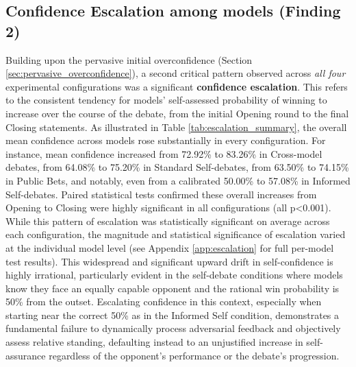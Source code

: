 \documentclass{article}
\begin{document}
\subsection{Confidence Escalation among models (Finding 2)}
Building upon the pervasive initial overconfidence (Section \ref{sec:pervasive_overconfidence}), a second critical pattern observed across \emph{all four} experimental configurations was a significant \textbf{confidence escalation}. This refers to the consistent tendency for models' self-assessed probability of winning to increase over the course of the debate, from the initial Opening round to the final Closing statements. As illustrated in Table \ref{tab:escalation_summary}, the overall mean confidence across models rose substantially in every configuration. For instance, mean confidence increased from 72.92\% to 83.26\% in Cross-model debates, from 64.08\% to 75.20\% in Standard Self-debates, from 63.50\% to 74.15\% in Public Bets, and notably, even from a calibrated 50.00\% to 57.08\% in Informed Self-debates. Paired statistical tests confirmed these overall increases from Opening to Closing were highly significant in all configurations (all p<0.001). While this pattern of escalation was statistically significant on average across each configuration, the magnitude and statistical significance of escalation varied at the individual model level (see Appendix \ref{app:escalation} for full per-model test results). This widespread and significant upward drift in self-confidence is highly irrational, particularly evident in the self-debate conditions where models know they face an equally capable opponent and the rational win probability is 50\% from the outset. Escalating confidence in this context, especially when starting near the correct 50\% as in the Informed Self condition, demonstrates a fundamental failure to dynamically process adversarial feedback and objectively assess relative standing, defaulting instead to an unjustified increase in self-assurance regardless of the opponent's performance or the debate's progression.
\end{document}

